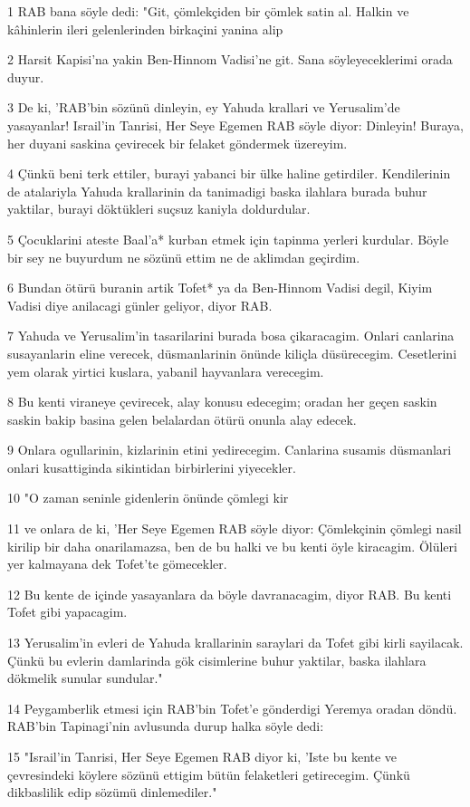 \par 1 RAB bana söyle dedi: "Git, çömlekçiden bir çömlek satin al. Halkin ve kâhinlerin ileri gelenlerinden birkaçini yanina alip
\par 2 Harsit Kapisi'na yakin Ben-Hinnom Vadisi'ne git. Sana söyleyeceklerimi orada duyur.
\par 3 De ki, 'RAB'bin sözünü dinleyin, ey Yahuda krallari ve Yerusalim'de yasayanlar! Israil'in Tanrisi, Her Seye Egemen RAB söyle diyor: Dinleyin! Buraya, her duyani saskina çevirecek bir felaket göndermek üzereyim.
\par 4 Çünkü beni terk ettiler, burayi yabanci bir ülke haline getirdiler. Kendilerinin de atalariyla Yahuda krallarinin da tanimadigi baska ilahlara burada buhur yaktilar, burayi döktükleri suçsuz kaniyla doldurdular.
\par 5 Çocuklarini ateste Baal'a* kurban etmek için tapinma yerleri kurdular. Böyle bir sey ne buyurdum ne sözünü ettim ne de aklimdan geçirdim.
\par 6 Bundan ötürü buranin artik Tofet* ya da Ben-Hinnom Vadisi degil, Kiyim Vadisi diye anilacagi günler geliyor, diyor RAB.
\par 7 Yahuda ve Yerusalim'in tasarilarini burada bosa çikaracagim. Onlari canlarina susayanlarin eline verecek, düsmanlarinin önünde kiliçla düsürecegim. Cesetlerini yem olarak yirtici kuslara, yabanil hayvanlara verecegim.
\par 8 Bu kenti viraneye çevirecek, alay konusu edecegim; oradan her geçen saskin saskin bakip basina gelen belalardan ötürü onunla alay edecek.
\par 9 Onlara ogullarinin, kizlarinin etini yedirecegim. Canlarina susamis düsmanlari onlari kusattiginda sikintidan birbirlerini yiyecekler.
\par 10 "O zaman seninle gidenlerin önünde çömlegi kir
\par 11 ve onlara de ki, 'Her Seye Egemen RAB söyle diyor: Çömlekçinin çömlegi nasil kirilip bir daha onarilamazsa, ben de bu halki ve bu kenti öyle kiracagim. Ölüleri yer kalmayana dek Tofet'te gömecekler.
\par 12 Bu kente de içinde yasayanlara da böyle davranacagim, diyor RAB. Bu kenti Tofet gibi yapacagim.
\par 13 Yerusalim'in evleri de Yahuda krallarinin saraylari da Tofet gibi kirli sayilacak. Çünkü bu evlerin damlarinda gök cisimlerine buhur yaktilar, baska ilahlara dökmelik sunular sundular."
\par 14 Peygamberlik etmesi için RAB'bin Tofet'e gönderdigi Yeremya oradan döndü. RAB'bin Tapinagi'nin avlusunda durup halka söyle dedi:
\par 15 "Israil'in Tanrisi, Her Seye Egemen RAB diyor ki, 'Iste bu kente ve çevresindeki köylere sözünü ettigim bütün felaketleri getirecegim. Çünkü dikbaslilik edip sözümü dinlemediler."


